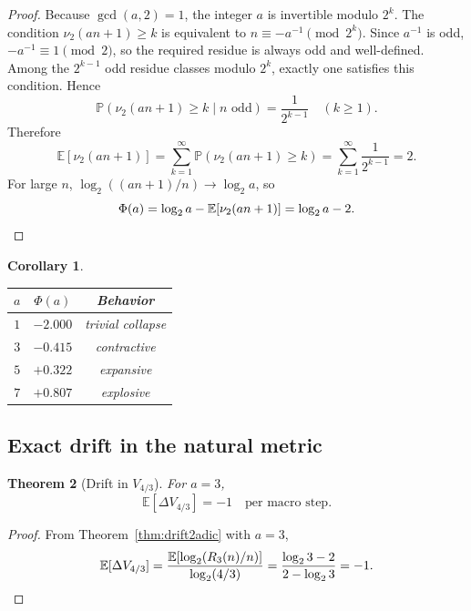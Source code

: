 \documentclass[12pt,reqno]{amsart}
\theoremstyle{plain}
\newtheorem{theorem}{Theorem}[section]
\newtheorem{corollary}[theorem]{Corollary}
\theoremstyle{definition}
\newcommand{\E}{\mathbb{E}}
\newcommand{\PP}{\mathbb{P}}
\newcommand{\nuTwo}{\nu_2}
\newcommand{\logtwo}{\log_2}
\newcommand{\PhiDrift}{\Phi}
\newcommand{\Vmetric}{V_{4/3}}
\begin{document}
\begin{proof}
Because $\gcd(a,2)=1$, the integer $a$ is invertible modulo $2^k$.
The condition $\nuTwo(an+1) \geq k$ is equivalent to
$n \equiv -a^{-1} \pmod{2^k}$.
Since $a^{-1}$ is odd, $-a^{-1} \equiv 1 \pmod{2}$, so the required residue
is always odd and well-defined.
Among the $2^{k-1}$ odd residue classes modulo $2^k$, exactly one satisfies
this condition. Hence
\[
\PP(\nuTwo(an+1) \geq k \mid n \text{ odd}) = \frac{1}{2^{k-1}} \quad (k \geq 1).
\]
Therefore
\[
\E[\nuTwo(an+1)] = \sum_{k=1}^{\infty} \PP(\nuTwo(an+1) \geq k)
                 = \sum_{k=1}^{\infty} \frac{1}{2^{k-1}}
                 = 2.
\]
For large $n$, $\logtwo((an+1)/n) \to \logtwo a$, so
\[
\PhiDrift(a) = \logtwo a - \E[\nuTwo(an+1)] = \logtwo a - 2. \qedhere
\]
\end{proof}

\begin{corollary}\label{cor:drift-values}
\begin{center}
\begin{tabular}{@{}ccc@{}}
\toprule
$a$ & $\PhiDrift(a)$ & Behavior \\
\midrule
$1$ & $-2.000$ & trivial collapse \\
$3$ & $-0.415$ & contractive \\
$5$ & $+0.322$ & expansive \\
$7$ & $+0.807$ & explosive \\
\bottomrule
\end{tabular}
\end{center}
\end{corollary}

\subsection{Exact drift in the natural metric}

\begin{theorem}[Drift in $\Vmetric$]\label{thm:driftV}
For $a=3$,
\begin{equation}\label{eq:driftV}
\E[\Delta \Vmetric] = -1 \quad \text{per macro step}.
\end{equation}
\end{theorem}

\begin{proof}
From Theorem~\ref{thm:drift2adic} with $a=3$,
\[
\E[\Delta \Vmetric]
= \frac{\E[\logtwo(R_3(n)/n)]}{\logtwo(4/3)}
= \frac{\logtwo 3 - 2}{2 - \logtwo 3}
= -1. \qedhere
\]
\end{proof}
\end{document}
